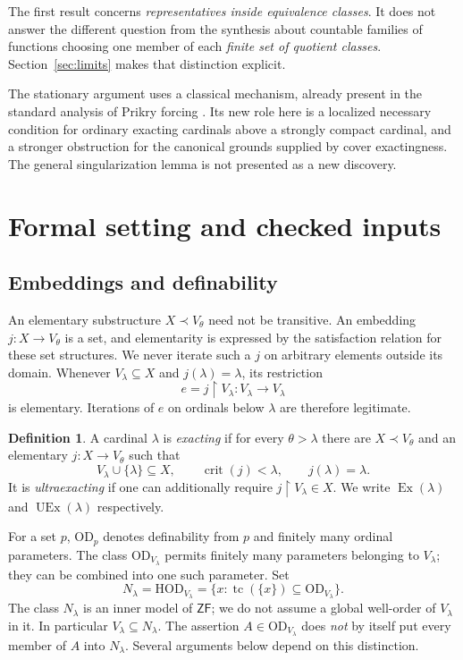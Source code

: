 \documentclass[11pt,letterpaper]{article}
\theoremstyle{definition}
\newtheorem{definition}{Definition}[section]
\numberwithin{equation}{section}
\newcommand{\ZF}{\mathsf{ZF}}
\newcommand{\HOD}{\mathrm{HOD}}
\newcommand{\OD}{\mathrm{OD}}
\newcommand{\Ex}{\operatorname{Ex}}
\newcommand{\UEx}{\operatorname{UEx}}
\newcommand{\crit}{\operatorname{crit}}
\newcommand{\restr}{\mathbin{\upharpoonright}}
\newcommand{\tc}{\operatorname{tc}}
\newcommand{\Nlam}{N_\lambda}
\begin{document}
The first result concerns \emph{representatives inside equivalence classes}. It does not answer the different question from the synthesis about countable families of functions choosing one member of each \emph{finite set of quotient classes}. Section~\ref{sec:limits} makes that distinction explicit.

The stationary argument uses a classical mechanism, already present in the standard analysis of Prikry forcing \cite{cummings}. Its new role here is a localized necessary condition for ordinary exacting cardinals above a strongly compact cardinal, and a stronger obstruction for the canonical grounds supplied by cover exactingness. The general singularization lemma is not presented as a new discovery.

\section{Formal setting and checked inputs}\label{sec:setting}

\subsection{Embeddings and definability}

An elementary substructure $X\prec V_\theta$ need not be transitive. An embedding $j:X\to V_\theta$ is a set, and elementarity is expressed by the satisfaction relation for these set structures. We never iterate such a $j$ on arbitrary elements outside its domain. Whenever $V_\lambda\subseteq X$ and $j(\lambda)=\lambda$, its restriction
\[
e=j\restr V_\lambda:V_\lambda\longrightarrow V_\lambda
\]
is elementary. Iterations of $e$ on ordinals below $\lambda$ are therefore legitimate.

\begin{definition}
A cardinal $\lambda$ is \emph{exacting} if for every $\theta>\lambda$ there are $X\prec V_\theta$ and an elementary $j:X\to V_\theta$ such that
\[
V_\lambda\cup\{\lambda\}\subseteq X,\qquad
\crit(j)<\lambda,\qquad j(\lambda)=\lambda.
\]
It is \emph{ultraexacting} if one can additionally require $j\restr V_\lambda\in X$. We write $\Ex(\lambda)$ and $\UEx(\lambda)$ respectively.
\end{definition}

For a set $p$, $\OD_p$ denotes definability from $p$ and finitely many ordinal parameters. The class $\OD_{V_\lambda}$ permits finitely many parameters belonging to $V_\lambda$; they can be combined into one such parameter. Set
\[
\Nlam=\HOD_{V_\lambda}
 =\{x:\tc(\{x\})\subseteq\OD_{V_\lambda}\}.
\]
The class $\Nlam$ is an inner model of $\ZF$; we do not assume a global well-order of $V_\lambda$ in it. In particular $V_\lambda\subseteq\Nlam$. The assertion $A\in\OD_{V_\lambda}$ does \emph{not} by itself put every member of $A$ into $\Nlam$. Several arguments below depend on this distinction.
\end{document}
